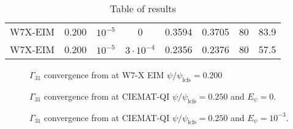 \begin{table}[]
\begin{tabular}{@{}cccccccc@{}}
		W7X-EIM       & 0.200   & $10^{-5}$    & 0     & 0.3594                                                                                  & 0.3705                                                                                      & 80          &  83.9                         \\
		W7X-EIM       & 0.200   & $10^{-5}$    & $3\cdot10^{-4}$    & 0.2356                                                                                  & 0.2376                                                                                      & 80          &  57.5                         \\ \bottomrule
	\end{tabular}
\caption{Table of {\DKES} results}
\end{table}

\begin{figure}
	
\end{figure}


\begin{figure}
	
	\caption{$\Gamma_{31}$ convergence from {\DKES} at W7-X EIM $\psi/\psi_{\text{lcfs}}=0.200$}
\end{figure}



\begin{figure}
	
	\caption{$\Gamma_{31}$ convergence from {\DKES} at CIEMAT-QI $\psi/\psi_{\text{lcfs}}=0.250$ and $E_\psi=0$.}
\end{figure}



\begin{figure}
	
	\caption{$\Gamma_{31}$ convergence from {\DKES} at CIEMAT-QI $\psi/\psi_{\text{lcfs}}=0.250$ and $E_\psi=10^{-3}$.}
\end{figure}